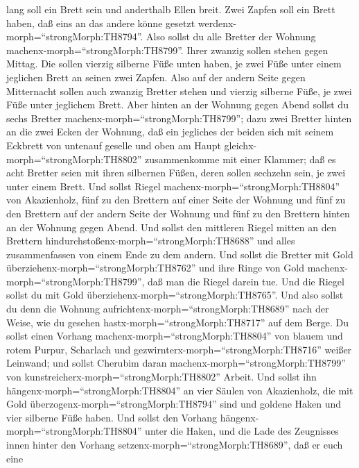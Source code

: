 lang soll ein Brett sein und anderthalb Ellen breit.  Zwei
Zapfen soll ein Brett haben, daß eins an das andere könne gesetzt
werdenx-morph=``strongMorph:TH8794''. Also sollst du alle Bretter der
Wohnung machenx-morph=``strongMorph:TH8799''.  Ihrer
zwanzig sollen stehen gegen Mittag.  Die sollen vierzig
silberne Füße unten haben, je zwei Füße unter einem jeglichen Brett an
seinen zwei Zapfen.  Also auf der andern Seite gegen
Mitternacht sollen auch zwanzig Bretter stehen  und vierzig
silberne Füße, je zwei Füße unter jeglichem Brett.  Aber
hinten an der Wohnung gegen Abend sollst du sechs Bretter
machenx-morph=``strongMorph:TH8799'';  dazu zwei Bretter
hinten an die zwei Ecken der Wohnung,  daß ein jegliches
der beiden sich mit seinem Eckbrett von untenauf geselle und oben am
Haupt gleichx-morph=``strongMorph:TH8802'' zusammenkomme mit einer
Klammer;  daß es acht Bretter seien mit ihren silbernen
Füßen, deren sollen sechzehn sein, je zwei unter einem Brett.
 Und sollst Riegel machenx-morph=``strongMorph:TH8804'' von
Akazienholz, fünf zu den Brettern auf einer Seite der Wohnung
 und fünf zu den Brettern auf der andern Seite der Wohnung
und fünf zu den Brettern hinten an der Wohnung gegen Abend.
 Und sollst den mittleren Riegel mitten an den Brettern
hindurchstoßenx-morph=``strongMorph:TH8688'' und alles zusammenfassen
von einem Ende zu dem andern.  Und sollst die Bretter mit
Gold überziehenx-morph=``strongMorph:TH8762'' und ihre Ringe von Gold
machenx-morph=``strongMorph:TH8799'', daß man die Riegel darein tue.
 Und die Riegel sollst du mit Gold
überziehenx-morph=``strongMorph:TH8765''. Und also sollst du denn die
Wohnung aufrichtenx-morph=``strongMorph:TH8689'' nach der Weise, wie du
gesehen hastx-morph=``strongMorph:TH8717'' auf dem Berge. 
Du sollst einen Vorhang machenx-morph=``strongMorph:TH8804'' von blauem
und rotem Purpur, Scharlach und gezwirnterx-morph=``strongMorph:TH8716''
weißer Leinwand; und sollst Cherubim daran
machenx-morph=``strongMorph:TH8799'' von
kunstreicherx-morph=``strongMorph:TH8802'' Arbeit.  Und
sollst ihn hängenx-morph=``strongMorph:TH8804'' an vier Säulen von
Akazienholz, die mit Gold überzogenx-morph=``strongMorph:TH8794'' sind
und goldene Haken und vier silberne Füße haben.  Und sollst
den Vorhang hängenx-morph=``strongMorph:TH8804'' unter die Haken, und
die Lade des Zeugnisses innen hinter den Vorhang
setzenx-morph=``strongMorph:TH8689'', daß er euch eine
